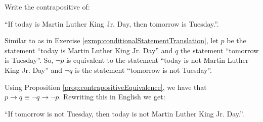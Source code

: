 \guard




\begin{exmp}
\label{exmp:contrapositiveStatementTranslation}
  Write the contrapositive of:
  \begin{center}
    ``If today is Martin Luther King Jr. Day, then tomorrow is Tuesday.''.
  \end{center}

  Similar to as in Exercise \ref{exmp:conditionalStatementTranslation}, let $p$ be the statement ``today is Martin Luther King Jr. Day'' and $q$ the statement ``tomorrow is Tuesday''.
  So, $\neg p$ is equivalent to the statement ``today is not Martin Luther King Jr. Day'' and $\neg q$ is the statement ``tomorrow is not Tuesday''.

  Using Proposition \ref{prop:contrapositiveEquivalence}, we have that $p\rightarrow q \equiv \neg q \rightarrow \neg p$.
  Rewriting this in English we get:
  \begin{center}
    ``If tomorrow is not Tuesday, then today is not Martin Luther King Jr. Day.''.
  \end{center}
\end{exmp}
